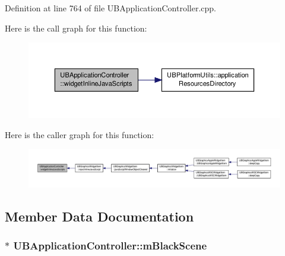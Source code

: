Definition at line 764 of file U\-B\-Application\-Controller.\-cpp.



Here is the call graph for this function\-:
\nopagebreak
\begin{figure}[H]
\begin{center}
\leavevmode
\includegraphics[width=350pt]{da/d14/class_u_b_application_controller_a6e16c1c071fab3c55732f8a91c541d93_cgraph}
\end{center}
\end{figure}




Here is the caller graph for this function\-:
\nopagebreak
\begin{figure}[H]
\begin{center}
\leavevmode
\includegraphics[width=350pt]{da/d14/class_u_b_application_controller_a6e16c1c071fab3c55732f8a91c541d93_icgraph}
\end{center}
\end{figure}




\subsection{Member Data Documentation}
\hypertarget{class_u_b_application_controller_aa46c5585a93df309cc911635e211d6bd}{
\subsubsection[{m\-Black\-Scene}]{$\ast$ U\-B\-Application\-Controller\-::m\-Black\-Scene\hspace{0.3cm}{\ttfamily [protected]}}}\label{da/d14/class_u_b_application_controller_aa46c5585a93df309cc911635e211d6bd}


